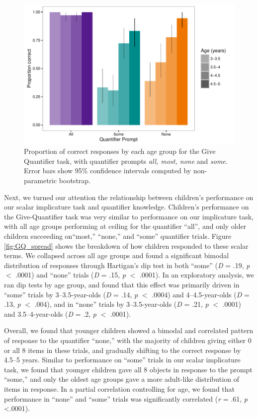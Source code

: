 \documentclass[man]{apa2}
\begin{document}
\begin{figure}
 \begin{center}
  \includegraphics[width=6in]{figures/exp3_GQperf.pdf}
  \caption{\label{fig:exp3_GQright} Proportion of correct responses by each age group for the Give Quantifier task, with quantifier prompts \textit{all, most, none} and \textit{some}. Error bars show 95\% confidence intervals computed by non-parametric bootstrap.}
 \end{center}
\end{figure}

Next, we turned our attention the relationship between children's performance on our scalar implicature task and quantifier knowledge. Children's performance on the Give-Quantifier task was very similar to performance on our implicature task, with all age groups performing at ceiling for the quantifier ``all'', and only older children succeeding on``most,'' ``none,'' and ``some'' quantifier trials. Figure \ref{fig:GQ_spread} shows the breakdown of how children responded to these scalar terms. We collapsed across all age groups and found a significant bimodal distribution of responses through Hartigan's dip test in both ``some'' (\emph{D} = .19, \emph{p} $<$ .0001) and ``none'' trials (\emph{D} = .15, \emph{p} $<$ .0001). In an exploratory analysis, we ran dip tests by age group, and found that this effect was primarily driven in ``some'' trials by 3--3.5-year-olds (\emph{D} = .14, \emph{p} $<$ .0004) and 4--4.5-year-olds (\emph{D} = .13, \emph{p} $<$ .004), and in ``none'' trials by 3--3.5-year-olds (\emph{D} = .21, \emph{p} $<$ .0001) and 3.5--4-year-olds (\emph{D} = .2, \emph{p} $<$ .0001).

Overall, we found that younger children showed a bimodal and correlated pattern of response to the quantifier ``none,'' with the majority of children giving either 0 or all 8 items in these trials, and gradually shifting to the correct response by 4.5--5 years. Similar to performance on ``some'' trials in our scalar implicature task, we found that younger children gave all 8 objects in response to the prompt ``some,'' and only the oldest age groups gave a more adult-like distribution of items in response. In a partial correlation controlling for age, we found that performance in ``none'' and ``some'' trials was significantly correlated (\textit{r} = .61, \textit{p} \textless .0001).
\end{document}
